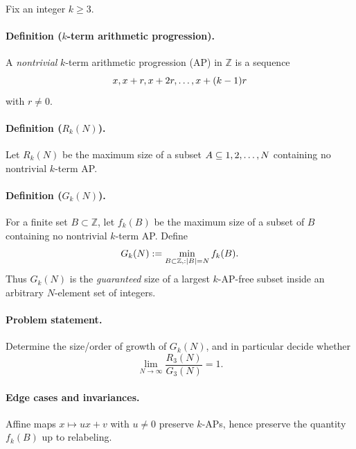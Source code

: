 Fix an integer $k\ge 3$.

\paragraph{Definition ($k$-term arithmetic progression).}
A \emph{nontrivial} $k$-term arithmetic progression (AP) in $\mathbb{Z}$ is a sequence
\[
x,\\ x+r,\\ x+2r,\dots,\\ x+(k-1)r
\]
with $r\ne 0$.

\paragraph{Definition ($R_k(N)$).}
Let $R_k(N)$ be the maximum size of a subset $A\subseteq\\{1,2,\dots,N\\}$ containing no nontrivial $k$-term AP.

\paragraph{Definition ($G_k(N)$).}
For a finite set $B\subset\mathbb{Z}$, let $f_k(B)$ be the maximum size of a subset of $B$ containing no nontrivial $k$-term AP.
Define
\[
G_k(N):=\min_{B\subset\mathbb{Z}\\,:\\ \left\lvert B\right\rvert=N} f_k(B).
\]
Thus $G_k(N)$ is the \emph{guaranteed} size of a largest $k$-AP-free subset inside an arbitrary $N$-element set of integers.

\paragraph{Problem statement.}
Determine the size/order of growth of $G_k(N)$, and in particular decide whether
\[
\lim_{N\to\infty}\frac{R_3(N)}{G_3(N)}=1.
\]

\paragraph{Edge cases and invariances.}
Affine maps $x\mapsto ux+v$ with $u\ne 0$ preserve $k$-APs, hence preserve the quantity $f_k(B)$ up to relabeling.
